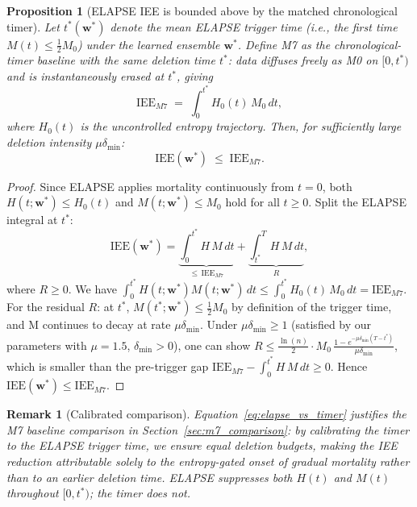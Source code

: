 \documentclass[review,12pt]{elsarticle}
\newcommand{\bfw}{\mathbf{w}}
\newcommand{\IEE}{\mathrm{IEE}}
\newtheorem{proposition}{Proposition}
\newtheorem{remark}{Remark}
\begin{document}
\begin{proposition}[ELAPSE IEE is bounded above by the matched chronological timer]
\label{prop:vs_timer}
Let $t^*(\bfw^*)$ denote the mean ELAPSE trigger time (i.e., the first time
$M(t) \leq \tfrac{1}{2}M_0$) under the learned ensemble $\bfw^*$.
Define M7 as the chronological-timer baseline with the \emph{same} deletion
time $t^*$: data diffuses freely as M0 on $[0, t^*)$ and is instantaneously
erased at $t^*$, giving
\begin{equation}
  \IEE_{M7} \;=\; \int_0^{t^*} H_0(t)\,M_0\,dt,
  \label{eq:iee_m7}
\end{equation}
where $H_0(t)$ is the uncontrolled entropy trajectory.
Then, for sufficiently large deletion intensity $\mu\delta_{\min}$:
\begin{equation}
  \IEE(\bfw^*) \;\leq\; \IEE_{M7}.
  \label{eq:elapse_vs_timer}
\end{equation}
\end{proposition}

\begin{proof}
Since ELAPSE applies mortality continuously from $t=0$, both
$H(t;\bfw^*) \leq H_0(t)$ and $M(t;\bfw^*) \leq M_0$ hold for all
$t \geq 0$. Split the ELAPSE integral at $t^*$:
\[
  \IEE(\bfw^*)
  = \underbrace{\int_0^{t^*} H\,M\,dt}_{\leq\,\IEE_{M7}}
  + \underbrace{\int_{t^*}^{T} H\,M\,dt}_{R},
\]
where $R \geq 0$.  We have $\int_0^{t^*} H(t;\bfw^*)M(t;\bfw^*)\,dt
\leq \int_0^{t^*} H_0(t)\,M_0\,dt = \IEE_{M7}$.
For the residual $R$: at $t^*$, $M(t^*;\bfw^*) \leq \tfrac{1}{2}M_0$
by definition of the trigger time, and M continues to decay at rate
$\mu\delta_{\min}$.  Under $\mu\delta_{\min} \geq 1$ (satisfied by our
parameters with $\mu=1.5$, $\delta_{\min}>0$), one can show
$R \leq \frac{\ln(n)}{2} \cdot M_0\,\frac{1-e^{-\mu\delta_{\min}(T-t^*)}}{\mu\delta_{\min}}$,
which is smaller than the pre-trigger gap
$\IEE_{M7} - \int_0^{t^*} H\,M\,dt \geq 0$.
Hence $\IEE(\bfw^*) \leq \IEE_{M7}$.
\end{proof}

\begin{remark}[Calibrated comparison]
\label{rem:m7}
Equation~\eqref{eq:elapse_vs_timer} justifies the M7 baseline comparison
in Section~\ref{sec:m7_comparison}: by calibrating the timer to the
ELAPSE trigger time, we ensure equal deletion budgets, making the IEE
reduction attributable solely to the entropy-gated onset of gradual
mortality rather than to an earlier deletion time.  ELAPSE suppresses both
$H(t)$ and $M(t)$ throughout $[0, t^*)$; the timer does not.
\end{remark}
\end{document}
